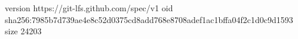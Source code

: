 version https://git-lfs.github.com/spec/v1
oid sha256:7985b7d739ae4e8c52d0375cd8add768e8708adef1ac1bffa04f2c1d0c9d1593
size 24203
